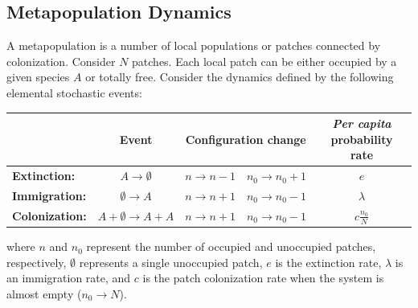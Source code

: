 \documentclass{article}
\begin{document}
\subsection*{Metapopulation Dynamics}
A metapopulation is a number of local populations or patches connected by colonization\cite{Alonso02,Levins69}. Consider $N$ patches. Each local patch can be either occupied by a given species $A$ or totally free.  Consider the dynamics defined by the following elemental stochastic events: 
\begin{center}
\begin{tabular}{ l c c c  c }                   
          & Event                          & \multicolumn{2}{c}{Configuration change}  &  {\em Per capita} probability rate \\ 
\hline
{\bf Extinction:}  & $A  \longrightarrow \emptyset$ &  $n \longrightarrow n - 1$ & $n_0 \longrightarrow n_0 + 1$  &  $e$ \\

{\bf Immigration:}  & $\emptyset \longrightarrow A$  &  $n \longrightarrow n + 1$ & $n_0 \longrightarrow n_0 - 1 $ &  $\lambda$ \\

{\bf Colonization:}  & $A + \emptyset \longrightarrow A + A$ & $n \longrightarrow n + 1$ & $n_0 \longrightarrow n_0 - 1$  &  $c\frac{n_0}{N}$ \\
\end{tabular}
\end{center}
where $n$ and $n_0$ represent the number of occupied and unoccupied patches, respectively, $\emptyset$ represents a single unoccupied patch, $e$ is the extinction rate, $\lambda$ is an immigration rate, and $c$ is the patch colonization rate when the system is almost empty ($n_0 \rightarrow N$).
\end{document}
